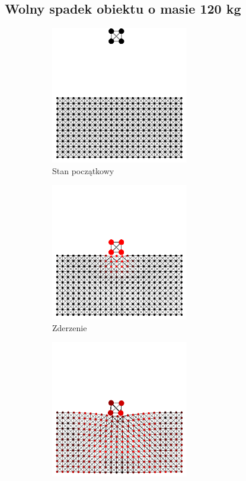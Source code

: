 \documentclass[12pt, letterpaper]{report}
\begin{document}
    \subsection{Wolny spadek obiektu o masie 120 kg}
    \begin{figure}[h]

        \begin{subfigure}{0.5\textwidth}
            \centering
            \includegraphics[width=6cm, height=6cm]{collision_2x2_24x12_mass30_1} 
            \caption{Stan początkowy}
        \end{subfigure}
        \begin{subfigure}{0.5\textwidth}
            \centering
            \includegraphics[width=6cm, height=6cm]{collision_2x2_24x12_mass30_2}
            \caption{Zderzenie}
        \end{subfigure}
        \begin{subfigure}{0.5\textwidth}
            \centering
            \includegraphics[width=6cm, height=6cm]{collision_2x2_24x12_mass30_3}

\end{subfigure}
\end{figure}
\end{document}
